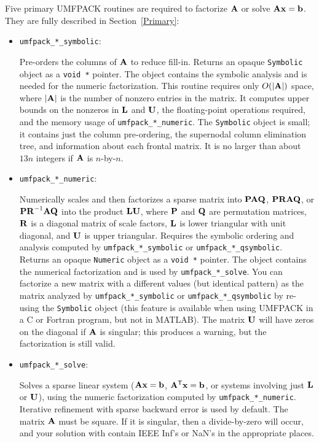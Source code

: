 \documentclass[11pt]{article}
\newcommand{\m}[1]{{\bf{#1}}}       %
\newcommand{\tr}{^{\sf T}}          %
\begin{document}
Five primary UMFPACK routines are required to factorize $\m{A}$ or
solve $\m{Ax}=\m{b}$.  They are fully described in Section~\ref{Primary}:

\begin{itemize}
\item {\tt umfpack\_*\_symbolic}:

    Pre-orders the columns of $\m{A}$ to reduce fill-in.
    Returns an opaque {\tt Symbolic} object as a {\tt void *}
    pointer.  The object contains the symbolic analysis and is needed for the
    numeric factorization.  This routine requires only $O(|\m{A}|)$ space,
    where $|\m{A}|$ is the number of nonzero entries in the matrix.  It computes
    upper bounds on the nonzeros in $\m{L}$ and $\m{U}$, the floating-point
    operations required, and the memory usage of {\tt umfpack\_*\_numeric}.  The
    {\tt Symbolic} object is small; it contains just the column pre-ordering,
    the supernodal column elimination tree, and information about each frontal
    matrix. It is no larger than about $13n$ integers if $\m{A}$ is
    $n$-by-$n$.

\item {\tt umfpack\_*\_numeric}:

    Numerically scales and then factorizes a sparse matrix into
    $\m{PAQ}$, $\m{PRAQ}$, or $\m{PR}^{-1}\m{AQ}$ into the product $\m{LU}$,
    where
    $\m{P}$ and $\m{Q}$ are permutation matrices, $\m{R}$ is a diagonal
    matrix of scale factors, $\m{L}$ is lower triangular with unit diagonal,
    and $\m{U}$ is upper triangular.  Requires the
    symbolic ordering and analysis computed by {\tt umfpack\_*\_symbolic}
    or {\tt umfpack\_*\_qsymbolic}.
    Returns an opaque {\tt Numeric} object as a
    {\tt void *} pointer.  The object contains the numerical factorization and
    is used by {\tt umfpack\_*\_solve}.  You can factorize a new matrix with a
    different values (but identical pattern) as the matrix analyzed by
    {\tt umfpack\_*\_symbolic} or {\tt umfpack\_*\_qsymbolic} by re-using the
    {\tt Symbolic} object (this feature is available when using UMFPACK in a
    C or Fortran program, but not in MATLAB).
    The matrix
    $\m{U}$ will have zeros on the diagonal if $\m{A}$ is singular; this
    produces a warning, but the factorization is still valid.

\item {\tt umfpack\_*\_solve}:

    Solves a sparse linear system ($\m{Ax}=\m{b}$, $\m{A}\tr\m{x}=\m{b}$, or
    systems involving just $\m{L}$ or $\m{U}$), using the numeric factorization
    computed by {\tt umfpack\_*\_numeric}.  Iterative refinement with sparse
    backward error \cite{ardd:89} is used by default.  The matrix $\m{A}$ must
    be square.  If it is singular, then a divide-by-zero will occur, and your
    solution with contain IEEE Inf's or NaN's in the appropriate places.


\end{itemize}
\end{document}
